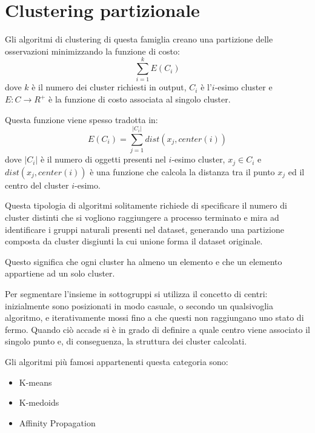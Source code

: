 \section{Clustering partizionale}
	Gli algoritmi di clustering di questa famiglia creano una partizione delle osservazioni minimizzando la funzione di costo:
	\begin{equation*}
	  \sum_{i=1}^{k}{E(C_i)}
	\end{equation*}
	dove $k$ è il numero dei cluster richiesti in output, $C_i$ è l'$i$-esimo cluster e $E:C \rightarrow R^{+}$ è la funzione di costo associata al singolo cluster.

	Questa funzione viene spesso tradotta in\cite{funzione_costo}:
	\begin{equation*}
	  	E(C_i) = \sum_{j=1}^{|C_i|}{dist(x_j, center(i))}
	\end{equation*}
	dove $|C_i|$ è il numero di oggetti presenti nel $i$-esimo cluster, $x_j \in C_i$  e $dist(x_j, center(i))$ è una funzione che calcola la distanza tra il punto $x_j$ ed il centro del cluster $i$-esimo.

	Questa tipologia di algoritmi solitamente richiede di specificare il numero di cluster distinti che si vogliono raggiungere a processo terminato e mira ad identificare i gruppi naturali presenti nel dataset, generando una partizione composta da cluster disgiunti la cui unione forma il dataset originale.

	Questo significa che ogni cluster ha almeno un elemento e che un elemento appartiene ad un solo cluster.

	Per segmentare l'insieme in sottogruppi si utilizza il concetto di centri: inizialmente sono posizionati in modo casuale, o secondo un qualsivoglia algoritmo, e iterativamente mossi fino a che questi non raggiungano uno stato di fermo. Quando ciò accade si è in grado di definire a quale centro viene associato il singolo punto e, di conseguenza, la struttura dei cluster calcolati. 

	Gli algoritmi più famosi appartenenti questa categoria sono: 
	\begin{itemize}
	  	\item K-means
	  	\item K-medoids
	  	\item Affinity Propagation
	\end{itemize}
